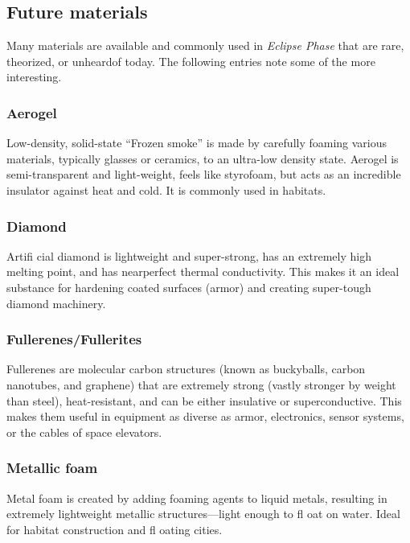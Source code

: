 \subsection{Future materials}
\label{sec:future-materials}

Many materials are available and commonly used in
\emph{Eclipse Phase} that are rare, theorized, or unheardof
today. The following entries note some of the
more interesting.

\subsubsection{Aerogel}

Low-density, solid-state “Frozen smoke” is made by
carefully foaming various materials, typically glasses
or ceramics, to an ultra-low density state. Aerogel
is semi-transparent and light-weight, feels like styrofoam,
but acts as an incredible insulator against
heat and cold. It is commonly used in habitats.

\subsubsection{Diamond}

Artifi cial diamond is lightweight and super-strong,
has an extremely high melting point, and has nearperfect
thermal conductivity. This makes it an ideal
substance for hardening coated surfaces (armor)
and creating super-tough diamond machinery.

\subsubsection{Fullerenes/Fullerites}

Fullerenes are molecular carbon structures (known
as buckyballs, carbon nanotubes, and graphene)
that are extremely strong (vastly stronger by weight
than steel), heat-resistant, and can be either insulative
or superconductive. This makes them useful in
equipment as diverse as armor, electronics, sensor
systems, or the cables of space elevators.

\subsubsection{Metallic foam}

Metal foam is created by adding foaming agents
to liquid metals, resulting in extremely lightweight
metallic structures—light enough to fl oat on water.
Ideal for habitat construction and fl oating cities.

